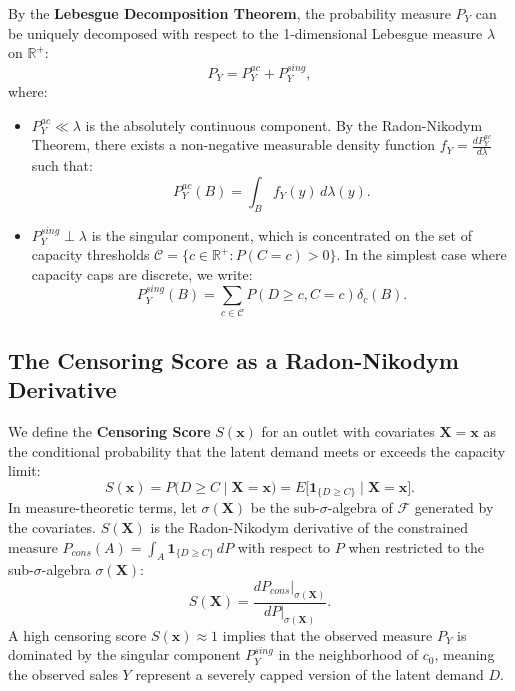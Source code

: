 \documentclass[11pt,a4paper]{article}
\theoremstyle{definition}
\begin{document}
By the \textbf{Lebesgue Decomposition Theorem}, the probability measure $P_Y$ can be uniquely decomposed with respect to the 1-dimensional Lebesgue measure $\lambda$ on $\mathbb{R}^+$:
\begin{equation}
    P_Y = P_Y^{ac} + P_Y^{sing},
\end{equation}
where:
\begin{itemize}
    \item $P_Y^{ac} \ll \lambda$ is the absolutely continuous component. By the Radon-Nikodym Theorem, there exists a non-negative measurable density function $f_Y = \frac{d P_Y^{ac}}{d\lambda}$ such that:
    \begin{equation}
        P_Y^{ac}(B) = \int_B f_Y(y) \, d\lambda(y).
    \end{equation}
    \item $P_Y^{sing} \perp \lambda$ is the singular component, which is concentrated on the set of capacity thresholds $\mathcal{C} = \{c \in \mathbb{R}^+ : P(C = c) > 0\}$. In the simplest case where capacity caps are discrete, we write:
    \begin{equation}
        P_Y^{sing}(B) = \sum_{c \in \mathcal{C}} P(D \ge c, C = c) \delta_c(B).
    \end{equation}
\end{itemize}

\subsection{The Censoring Score as a Radon-Nikodym Derivative}
We define the \textbf{Censoring Score} $S(\bm{x})$ for an outlet with covariates $\bm{X} = \bm{x}$ as the conditional probability that the latent demand meets or exceeds the capacity limit:
\begin{equation}
    S(\bm{x}) = P\big(D \ge C \mid \bm{X} = \bm{x}\big) = E\big[\bm{1}_{\{D \ge C\}} \mid \bm{X} = \bm{x}\big].
\end{equation}
In measure-theoretic terms, let $\sigma(\bm{X})$ be the sub-$\sigma$-algebra of $\mathcal{F}$ generated by the covariates. $S(\bm{X})$ is the Radon-Nikodym derivative of the constrained measure $P_{cons}(A) = \int_A \bm{1}_{\{D \ge C\}} \, dP$ with respect to $P$ when restricted to the sub-$\sigma$-algebra $\sigma(\bm{X})$:
\begin{equation}
    S(\bm{X}) = \frac{d P_{cons}\vert_{\sigma(\bm{X})}}{d P\vert_{\sigma(\bm{X})}}.
\end{equation}
A high censoring score $S(\bm{x}) \approx 1$ implies that the observed measure $P_Y$ is dominated by the singular component $P_Y^{sing}$ in the neighborhood of $c_0$, meaning the observed sales $Y$ represent a severely capped version of the latent demand $D$.
\end{document}
